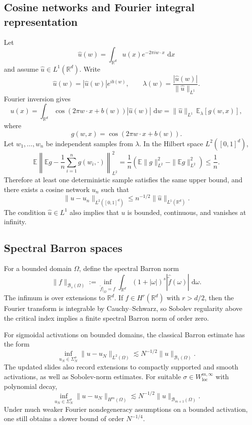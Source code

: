 \documentclass[11pt,a4paper]{article}
\newcommand{\R}{\mathbb{R}}
\newcommand{\dd}{\,\mathrm{d}}
\theoremstyle{definition}
\theoremstyle{plain}
\theoremstyle{remark}
\theoremstyle{plain}
\begin{document}
\subsection{Cosine networks and Fourier integral representation}
Let
\[
  \widehat u(w)=\int_{\R^d}u(x)e^{-2\pi i w\cdot x}\,\dd x
\]
and assume $\widehat u\in L^1(\R^d)$. Write
\[
  \widehat u(w)=|\widehat u(w)|e^{ib(w)},
  \qquad
  \lambda(w)=\frac{|\widehat u(w)|}{\|\widehat u\|_{L^1}}.
\]
Fourier inversion gives
\[
  u(x)
  =\int_{\R^d}\cos(2\pi w\cdot x+b(w))|\widehat u(w)|\,\dd w
  =\|\widehat u\|_{L^1}\,\mathbb E_\lambda[g(w,x)],
\]
where
\[
  g(w,x)=\cos(2\pi w\cdot x+b(w)).
\]
Let $w_1,\ldots,w_n$ be independent samples from $\lambda$. In the Hilbert space $L^2([0,1]^d)$,
\[
  \mathbb E\left\|
  \mathbb E g-\frac1n\sum_{i=1}^ng(w_i,\cdot)
  \right\|_{L^2}^2
  =\frac1n\left(
  \mathbb E\|g\|_{L^2}^2-\|\mathbb E g\|_{L^2}^2
  \right)
  \le\frac1n.
\]
Therefore at least one deterministic sample satisfies the same upper bound, and there exists a cosine network $u_n$ such that
\[
  \|u-u_n\|_{L^2([0,1]^d)}
  \le n^{-1/2}\|\widehat u\|_{L^1(\R^d)}.
\]
The condition $\widehat u\in L^1$ also implies that $u$ is bounded, continuous, and vanishes at infinity.

\subsection{Spectral Barron spaces}
For a bounded domain $\Omega$, define the spectral Barron norm
\[
  \|f\|_{\mathcal B_s(\Omega)}
  :=\inf_{\widetilde f|_\Omega=f}
  \int_{\R^d}(1+|\omega|)^s
  |\widehat{\widetilde f}(\omega)|\,\dd\omega.
\]
The infimum is over extensions to $\R^d$. If $f\in H^r(\R^d)$ with $r>d/2$, then the Fourier transform is integrable by Cauchy--Schwarz, so Sobolev regularity above the critical index implies a finite spectral Barron norm of order zero.

For sigmoidal activations on bounded domains, the classical Barron estimate has the form
\[
  \inf_{u_N\in\Sigma_N^\sigma}
  \|u-u_N\|_{L^2(\Omega)}
  \lesssim N^{-1/2}\|u\|_{\mathcal B_1(\Omega)}.
\]
The updated slides also record extensions to compactly supported and smooth activations, as well as Sobolev-norm estimates. For suitable $\sigma\in W^{m,\infty}_{\mathrm{loc}}$ with polynomial decay,
\[
  \inf_{u_N\in\Sigma_N^\sigma}
  \|u-u_N\|_{H^m(\Omega)}
  \lesssim N^{-1/2}\|u\|_{\mathcal B_{m+1}(\Omega)}.
\]
Under much weaker Fourier nondegeneracy assumptions on a bounded activation, one still obtains a slower bound of order $N^{-1/4}$.
\end{document}
